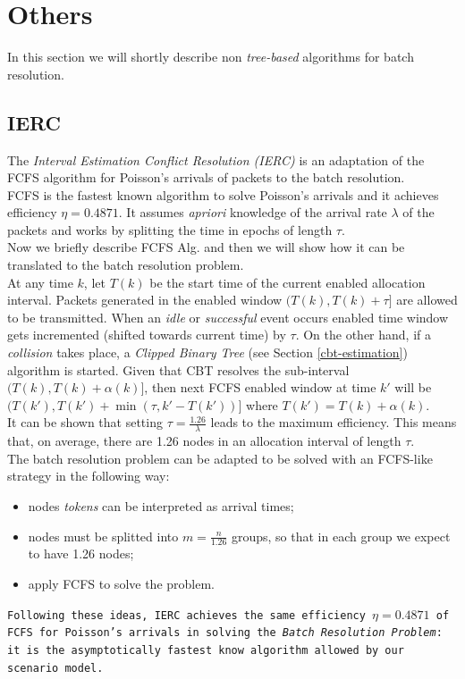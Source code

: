 \documentclass[11pt,a4paper,twoside,openright]{book}
\newcommand{\revv}[1]{{\tt#1}}
\begin{document}
\section{Others}
In this section we will shortly describe non \emph{tree-based} algorithms for batch resolution.
\subsection{IERC}
The \emph{Interval Estimation Conflict Resolution (IERC)} \cite{popovski} is an adaptation of the FCFS \cite{gallager} algorithm for Poisson's arrivals of packets to the batch resolution.\\
FCFS is the fastest known algorithm to solve Poisson's arrivals and it achieves efficiency $\eta=0.4871$.
It assumes \emph{apriori} knowledge of the arrival rate $\lambda$ of the packets and works by splitting the time in epochs of length $\tau$.\\
Now we briefly describe FCFS Alg. and then we will show how it can be translated to the batch resolution problem.\\ 

At any time $k$, let $T (k)$ be the start time of the current enabled allocation interval. Packets generated in the enabled window $(T(k),T(k)+\tau]$ are allowed to be transmitted.
When an \emph{idle} or \emph{successful} event occurs enabled time window gets incremented (shifted towards current time) by $\tau$. On the other hand, if a \emph{collision} takes place, a \emph{Clipped Binary Tree} (see Section \ref{cbt-estimation}) algorithm is started. Given that CBT resolves the sub-interval $(T(k),T(k)+\alpha(k)]$, then next FCFS enabled window at time $k'$ will be $(T(k'),T(k')+\min(\tau,k'-T(k'))]$ where $T(k')=T(k)+\alpha(k)$.\\

It can be shown \cite{gallager} that setting  $\tau={\displaystyle \frac{1.26}{\lambda}}$ leads to the maximum efficiency. This means that, on average, there are 1.26 nodes in an allocation interval of length $\tau$.\\
The batch resolution problem can be adapted to be solved with an FCFS-like strategy in the following way:
\begin{itemize}
\item nodes \emph{tokens} can be interpreted as arrival times;
\item nodes must be splitted into $m={\displaystyle \frac{n}{1.26}}$ groups, so that in each group we expect to have 1.26 nodes;
\item apply FCFS to solve the problem.
\end{itemize}
\revv{Following  these ideas, IERC achieves the same efficiency $\eta=0.4871$ of FCFS for Poisson's arrivals in solving the \emph{Batch Resolution Problem}: it is the asymptotically fastest know algorithm allowed by our scenario model. }
\end{document}
